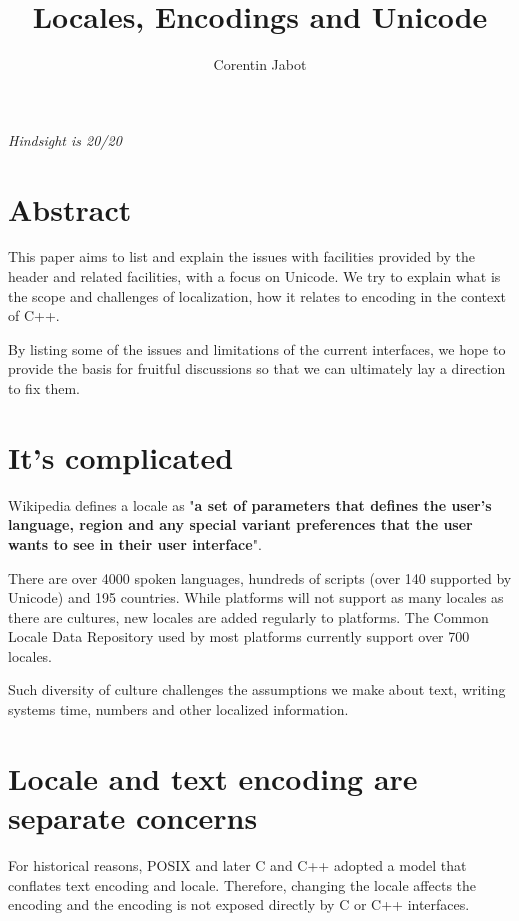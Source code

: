 \documentclass{wg21}
\title{Locales, Encodings and Unicode}
\author{Corentin Jabot}{corentin.jabot@gmail.com}
\begin{document}
\maketitle

\begin{flushright}
    \hfill \break
    \hfill \break
    \textit{Hindsight is 20/20}
\end{flushright}

\section{Abstract}

This paper aims to list and explain the issues with facilities provided by the  header and related facilities, with a focus on Unicode.
We try to explain what is the scope and challenges of localization, how it relates to encoding in the context of C++.

By listing some of the issues and limitations of the current interfaces, we hope to provide the basis for fruitful discussions so that we can ultimately lay a direction to fix them. 

\section{It's complicated}

Wikipedia defines a locale as "\textbf{a set of parameters that defines the user's language, region and any special variant preferences that the user wants to see in their user interface}".

There are over 4000 spoken languages, hundreds of scripts (over 140 supported by Unicode) and 195 countries.
While platforms will not support as many locales as there are cultures, new locales are added regularly to platforms.
The Common Locale Data Repository used by most platforms currently support over 700 locales.

Such diversity of culture challenges the assumptions we make about text, writing systems time, numbers and other localized information.


\section{Locale and text encoding are separate concerns}

For historical reasons, POSIX and later C and C++ adopted a model that conflates text encoding and locale.
Therefore, changing the locale affects the encoding and the encoding is not exposed directly by C or C++ interfaces.
\end{document}
